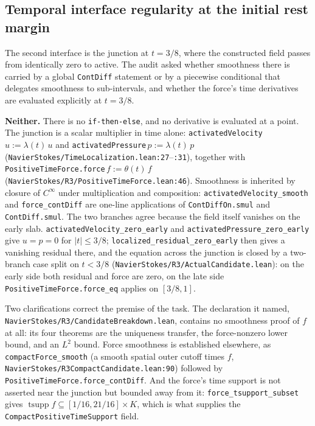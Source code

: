 \documentclass[11pt]{article}
\newcommand{\ct}[1]{\texttt{#1}}
\newcommand{\file}[1]{\texttt{\small #1}}
\theoremstyle{plain}
\theoremstyle{definition}
\theoremstyle{remark}
\begin{document}
\subsection{Temporal interface regularity at the initial rest margin}
\label{sec:temporal-bump}

The second interface is the junction at $t=3/8$, where the constructed field
passes from identically zero to active. The audit asked whether smoothness there
is carried by a global \ct{ContDiff} statement or by a piecewise conditional that
delegates smoothness to sub-intervals, and whether the force's time derivatives
are evaluated explicitly at $t=3/8$.

\textbf{Neither.} There is no \ct{if-then-else}, and no derivative is evaluated
at a point. The junction is a scalar multiplier in time alone:
\ct{activatedVelocity}\,$u:=\lambda(t)\,u$ and
\ct{activatedPressure}\,$p:=\lambda(t)\,p$
(\file{NavierStokes/TimeLocalization.lean:27}--\file{:31}), together with
\ct{PositiveTimeForce.force}\,$f:=\theta(t)\,f$
(\file{NavierStokes/R3/PositiveTimeForce.lean:46}). Smoothness is inherited by
closure of $C^\infty$ under multiplication and composition:
\ct{activatedVelocity\_smooth} and \ct{force\_contDiff} are one-line
applications of \ct{ContDiffOn.smul} and \ct{ContDiff.smul}. The two branches
agree because the field itself vanishes on the early slab.
\ct{activatedVelocity\_zero\_early} and \ct{activatedPressure\_zero\_early} give
$u=p=0$ for $|t|\le3/8$; \ct{localized\_residual\_zero\_early} then gives a
vanishing residual there, and the equation across the junction is closed by a
two-branch case split on $t<3/8$
(\file{NavierStokes/R3/ActualCandidate.lean}): on the early side both residual
and force are zero, on the late side \ct{PositiveTimeForce.force\_eq} applies on
$[3/8,1]$.

Two clarifications correct the premise of the task. The declaration it named,
\file{NavierStokes/R3/CandidateBreakdown.lean}, contains no smoothness proof of
$f$ at all: its four theorems are the uniqueness transfer, the force-nonzero
lower bound, and an $L^2$ bound. Force smoothness is established elsewhere, as
\ct{compactForce\_smooth} (a smooth spatial outer cutoff times $f$,
\file{NavierStokes/R3CompactCandidate.lean:90}) followed by
\ct{PositiveTimeForce.force\_contDiff}. And the force's time support is not
asserted near the junction but bounded away from it:
\ct{force\_tsupport\_subset} gives
$\operatorname{tsupp}f\subseteq[1/16,21/16]\times K$, which is what supplies the
\ct{CompactPositiveTimeSupport} field.
\end{document}

